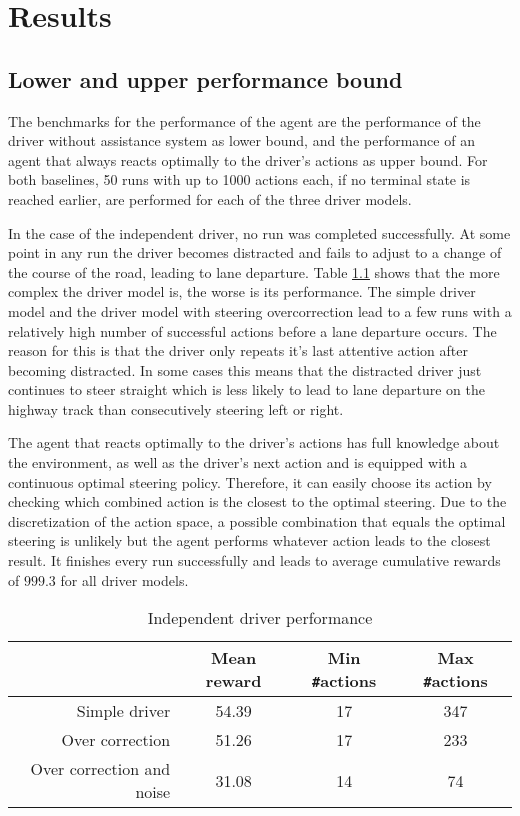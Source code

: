\chapter{Results}
\label{ch:results}

\section{Lower and upper performance bound}

The benchmarks for the performance of the agent are the performance of the driver without assistance system as lower bound, and the performance of an agent that always reacts optimally to the driver's actions as upper bound. For both baselines, 50 runs with up to 1000 actions each, if no terminal state is reached earlier, are performed for each of the three driver models. 

In the case of the independent driver, no run was completed successfully. At some point in any run the driver becomes distracted and fails to adjust to a change of the course of the road, leading to lane departure. Table \ref{tab:driver_performance} shows that the more complex the driver model is, the worse is its performance. The simple driver model and the driver model with steering overcorrection lead to a few runs with a relatively high number of successful actions before a lane departure occurs. The reason for this is that the driver only repeats it's last attentive action after becoming distracted. In some cases this means that the distracted driver just continues to steer straight which is less likely to lead to lane departure on the highway track than consecutively steering left or right.

The agent that reacts optimally to the driver's actions has full knowledge about the environment, as well as the driver's next action and is equipped with a continuous optimal steering policy. Therefore, it can easily choose its action by checking which combined action is the closest to the optimal steering. Due to the discretization of the action space, a possible combination that equals the optimal steering is unlikely but the agent performs whatever action leads to the closest result. It finishes every run successfully and leads to average cumulative rewards of $999.3$ for all driver models.

\begin{table}[htbp]
\footnotesize
\centering
\begin{tabular}{@{}rccc@{}}
\toprule
                            & Mean reward & Min \texttt{\#}actions & Max \texttt{\#}actions \\ \midrule
Simple driver               & 54.39       & 17                     & 347                    \\
Over correction             & 51.26       & 17                     & 233                    \\
Over correction and noise   & 31.08       & 14                     & 74                     \\ \bottomrule
\end{tabular}
\caption{Independent driver performance}
\label{tab:driver_performance}
\end{table}

